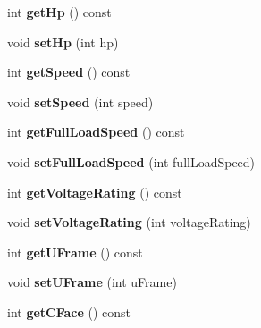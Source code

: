 \begin{DoxyCompactItemize}
\item 
\mbox{\label{class_motor_data_a4815d7d856deb37f89ed415ae8997948}} 
int {\bfseries get\+Hp} () const
\item 
\mbox{\label{class_motor_data_ac27f7062a26c94e29c25219883aa2915}} 
void {\bfseries set\+Hp} (int hp)
\item 
\mbox{\label{class_motor_data_a0385467a61f357c7d10fd70e22372afb}} 
int {\bfseries get\+Speed} () const
\item 
\mbox{\label{class_motor_data_a27f9f3513065e478edcf0342938059ec}} 
void {\bfseries set\+Speed} (int speed)
\item 
\mbox{\label{class_motor_data_ad1ba66ba5af859acaea57a91a7916626}} 
int {\bfseries get\+Full\+Load\+Speed} () const
\item 
\mbox{\label{class_motor_data_af6c25bd37ff58634fcf4885ada9fc1d1}} 
void {\bfseries set\+Full\+Load\+Speed} (int full\+Load\+Speed)
\item 
\mbox{\label{class_motor_data_a3ede25b7319b0d58af591c7737a56c43}} 
int {\bfseries get\+Voltage\+Rating} () const
\item 
\mbox{\label{class_motor_data_a335c9f5f1326dbf28bd9d7a652949d1f}} 
void {\bfseries set\+Voltage\+Rating} (int voltage\+Rating)
\item 
\mbox{\label{class_motor_data_aaee859b8d0bebd675a696e710efc3c35}} 
int {\bfseries get\+U\+Frame} () const
\item 
\mbox{\label{class_motor_data_a34fdfe66af559bb3d8e619b13d9dae11}} 
void {\bfseries set\+U\+Frame} (int u\+Frame)
\item 
\mbox{\label{class_motor_data_aefee8283ca18117b6272ab70e183dcec}} 
int {\bfseries get\+C\+Face} () const
\item 
\mbox{\label{class_motor_data_ae58247551e510b76ef28e56b7296b5b9}} 

\end{DoxyCompactItemize}
